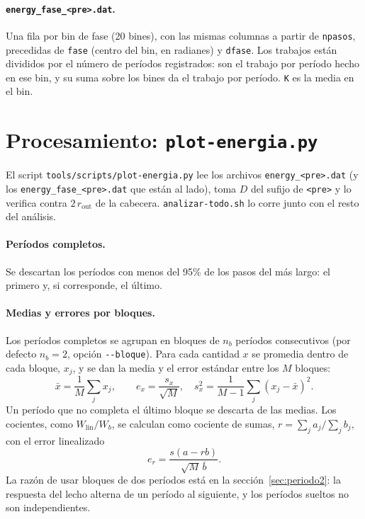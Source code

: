 \documentclass[11pt,a4paper]{article}
\newcommand{\code}[1]{\texttt{#1}}
\newcommand{\Wb}{W_b}
\newcommand{\Wlin}{W_\text{lin}}
\begin{document}
\paragraph{\code{energy\_fase\_<pre>.dat}.} Una fila por bin de fase (20
bines), con las mismas columnas a partir de \code{npasos}, precedidas de
\code{fase} (centro del bin, en radianes) y \code{dfase}. Los trabajos
están divididos por el número de períodos registrados: son el trabajo por
período hecho en ese bin, y su suma sobre los bines da el trabajo por
período. \code{K} es la media en el bin.

\section{Procesamiento: \code{plot-energia.py}}

El script \code{tools/scripts/plot-energia.py} lee los archivos
\code{energy\_<pre>.dat} (y los \code{energy\_fase\_<pre>.dat} que están
al lado), toma $D$ del sufijo de
\code{<pre>} y lo verifica contra $2\,r_\text{out}$ de la cabecera.
\code{analizar-todo.sh} lo corre junto con el resto del análisis.

\paragraph{Períodos completos.} Se descartan los períodos con menos del
95\% de los pasos del más largo: el primero y, si corresponde, el
último.

\paragraph{Medias y errores por bloques.} Los períodos completos se agrupan
en bloques de $n_b$ períodos consecutivos (por defecto $n_b = 2$,
opción \code{-{}-bloque}). Para cada cantidad $x$ se promedia dentro de
cada bloque, $x_j$, y se dan la media y el error estándar entre los
$M$ bloques:
\begin{equation}
  \bar x = \frac{1}{M} \sum_j x_j , \qquad
  e_x = \frac{s_x}{\sqrt{M}} , \quad
  s_x^2 = \frac{1}{M-1} \sum_j (x_j - \bar x)^2 .
\end{equation}
Un período que no completa el último bloque se descarta de las medias. Los
cocientes, como $\Wlin/\Wb$, se calculan como cociente de sumas,
$r = \sum_j a_j / \sum_j b_j$, con el error linealizado
\begin{equation}
  e_r = \frac{s(a - r b)}{\sqrt{M}\, \bar b} .
\end{equation}
La razón de usar bloques de dos períodos está en la
sección~\ref{sec:periodo2}: la respuesta del lecho alterna de un período al
siguiente, y los períodos sueltos no son independientes.
\end{document}
